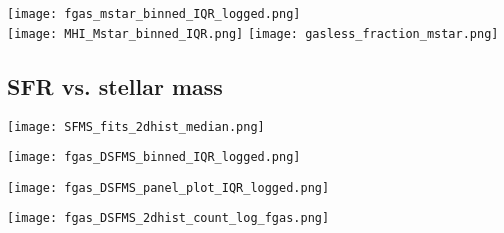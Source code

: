 \documentclass[fleqn,usenatbib]{mnras}
\begin{document}
\begin{figure*}
\texttt{[image: fgas\_mstar\_binned\_IQR\_logged.png]}\\
\texttt{[image: MHI\_Mstar\_binned\_IQR.png]}
\texttt{[image: gasless\_fraction\_mstar.png]}
\caption{{\bf Left:} The running median of f$_{\rm gas}$ as a function of stellar mass for each dataset with shading denoting the inner quartile range of each. Unlike in Figure~\ref{fig:fgas mstar 2D}, this includes galaxies with zero neutral gas mass. {\bf Middle} The running median of gas mass as a function of stellar mass for each dataset with shading denoting the IQR. {\bf Right:} The fraction of galaxies per stellar mass bin for each dataset that do not contain any neutral gas. The percent of all galaxies without gas in each dataset is shown in the legend.}
\label{fig:linear fgas mstar}
\end{figure*}

\subsection{SFR vs. stellar mass}
\label{sec:results:SFMS fgas}


\begin{figure*}
\texttt{[image: SFMS\_fits\_2dhist\_median.png]}\\
\caption{2D Histograms of the SFMS, colored by median gas fraction. }
\label{fig:SFMS fgas}
\end{figure*}


\begin{figure*}
\texttt{[image: fgas\_DSFMS\_binned\_IQR\_logged.png]}\\
\caption{Running median and IQR of the gas fraction of galaxies as a function of their distance (in dex) from the SFMS, as defined in Figure~\ref{fig:SFMS fgas}.}
\label{fig:fgas DSFMS}
\end{figure*}

\begin{figure*}
\texttt{[image: fgas\_DSFMS\_panel\_plot\_IQR\_logged.png]}\\
\caption{Same as Figure~\ref{fig:fgas DSFMS}, but separated into stellar mass bins.}
\label{fig:fgas DSFMS panel}
\end{figure*}

\begin{figure*}
\texttt{[image: fgas\_DSFMS\_2dhist\_count\_log\_fgas.png]}\\
\caption{2D histogram of fraction of galaxies in a given gas fraction and distance from SFMS bin.}
\label{fig:fgas DSFMS panel}
\end{figure*}
\end{document}
